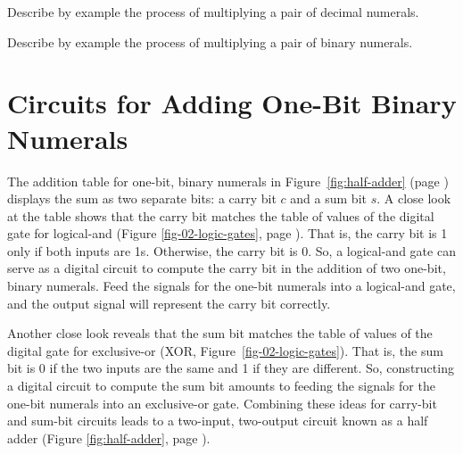 \begin{ExerciseList}
\Exercise Describe by example the process of multiplying a pair of decimal numerals.

\Exercise Describe by example the process of multiplying a pair of binary numerals.
\end{ExerciseList}

\section{Circuits for Adding One-Bit Binary Numerals}
\label{sec:adding-1-bit-numerals}

The addition table for one-bit, binary numerals
in Figure~\ref{fig:half-adder} (page \pageref{fig:half-adder})
displays the sum as two separate bits:
a carry bit $c$ and a sum bit $s$.
A close look at the table shows that
the carry bit matches the table of values of the
digital gate for logical-and 
(Figure \ref{fig-02-logic-gates}, page \pageref{fig-02-logic-gates}).
That is, the carry bit is 1 only if both inputs are 1s.
Otherwise, the carry bit is 0.
So, a logical-and gate can serve 
as a digital circuit to compute the carry bit
in the addition of two one-bit, binary numerals.
Feed the signals for the one-bit numerals
into a logical-and gate, and the output signal
will represent the carry bit correctly.

Another close look reveals that the sum bit
matches the table of values of the
digital gate for exclusive-or
(XOR, Figure~\ref{fig-02-logic-gates}).
That is, the sum bit is 0 if the two inputs are the same
and 1 if they are different.
So, constructing a digital circuit to compute the sum bit
amounts to feeding the signals for the one-bit numerals
into an exclusive-or gate.
Combining these ideas for carry-bit and sum-bit circuits
leads to a two-input, two-output circuit known as a
half adder (Figure \ref{fig:half-adder}, page \pageref{fig:half-adder}).


